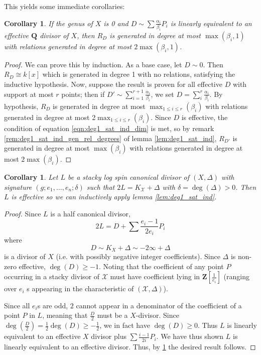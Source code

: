 \documentclass{amsart}
\theoremstyle{plain}
\newtheorem{cor}[thm]{Corollary}
\theoremstyle{definition}
\theoremstyle{remark}
\numberwithin{equation}{section}
\newcommand \sx{\mathscr X}
\newcommand \subhalf[1]{\frac{{#1} - 1}{2{#1}}}
\newcommand \halfcan{L}
\begin{document}
This yields some immediate corollaries:

\begin{cor}\label{cor:effective_Q_divisor_can_ring}
If the genus of $X$ is 0 and $D\sim\sum \frac{\alpha_i}{\beta_i} P_i$ is linearly equivalent to an effective $\mathbf{Q}$ divisor of $X$, then $R_D$ is generated in degree at most $\max(\beta_i,1)$ with relations generated in degree at most $2\max(\beta_i,1)$.
\end{cor}

\begin{proof}
We can prove this by induction.  As a base case, let $D\sim 0$.  Then $R_D\cong k[x]$ which is generated in degree 1 with no relations, satisfying the inductive hypothesis.
Now, suppose the result is proven for all effective $D$ with support at most $r$ points; then if $D'\sim \sum_{i=1}^{r+1} \frac{\alpha_i}{\beta_i}$, we set $D=\sum_i^{r} \frac{\alpha_i}{\beta_i}$.  By hypothesis, $R_D$ is generated in degree at most $\max_{1\le i\le r}(\beta_i)$ with relations generated in degree at most 2$\max_{1\le i\le r}(\beta_i)$.  Since $D$ is effective, the condition of equation \ref{eqn:deg1_sat_ind_dim} is met, so by remark \ref{rem:deg1_sat_ind_gen_rel_degrees} of lemma \ref{lem:deg1_sat_ind}, $R_{D'}$ is generated in degree at most $\max(\beta_i)$ with relations generated in degree at most $2\max(\beta_i)$.
\end{proof}


\begin{cor}\label{cor:genus_0_posiive_delta}
Let $\halfcan$ be a stacky log spin canonical divisor of $(X,\Delta)$ with signature $(g;e_1,\ldots, e_n;\delta)$ such that $2\halfcan=K_\sx+\Delta$ with $\delta=\deg(\Delta)>0$.  Then $\halfcan$ is effective so we can inductively apply lemma \ref{lem:deg1_sat_ind}.
\end{cor}
\begin{proof}
Since $\halfcan$ is a half canonical divisor, 
\[
	2\halfcan=D+\sum \subhalf{e_i}P_i
\] 
where 
\[
	D\sim K_X+\Delta\sim -2\infty+ \Delta
\] is a divisor of $X$ (i.e. with 
possibly negative integer coefficients).  Since $\Delta$ is non-
zero effective, $\deg(D)\ge -1$.   Noting that the coefficient of 
any point $P$ occurring in a stacky divisor of $\sx$ must have 
coefficient lying in $\mathbf{Z}[\frac{1}{e_i}]$ (ranging over $e_i$
s appearing in the characteristic of $(\sx,\Delta)$).
 
Since all $e_i$s are odd, $2$ cannot appear in a denominator of the 
coefficient of a point $P$ in $\halfcan$, meaning that $\frac{D}{2}$
 must be a $X$-divisor.  Since $\deg(\frac{D}{2})=\frac{1}{2}\deg(D)
\ge -\frac{1}{2}$, we in fact have $\deg(D)\ge 0$.  Thus $\halfcan$ 
is linearly equivalent to an effective $X$ divisor plus $\sum 
\subhalf{i}P_i$.  We have thus shown $\halfcan$ is linearly equivalent to an effective divisor.  Thus, by \ref{cor:effective_Q_divisor_can_ring} the desired result follows.
\end{proof}
\end{document}
